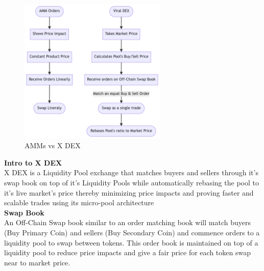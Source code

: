 \documentclass[letterpaper,11pt]{article}
\begin{document}
\begin{figure}[H]
\begin{center}
\includegraphics[width=7cm]{dex}
\caption{AMMs vs X DEX}
\end{center}
\end{figure}

\textbf{Intro to X DEX}\\

X DEX is a Liquidity Pool exchange that matches buyers and sellers through it's swap book on top of it's Liquidity Pools while automatically rebasing the pool to it's live market's price thereby minimizing price impacts and proving faster and scalable trades using its micro-pool architecture\\

\textbf{Swap Book}\\

An Off-Chain Swap book similar to an order matching book will match buyers (Buy Primary Coin) and sellers (Buy Secondary Coin) and commence orders to a liquidity pool to swap between tokens. This order book is maintained on top of a liquidity pool to reduce price impacts and give a fair price for each token swap near to market price. 
\end{document}
